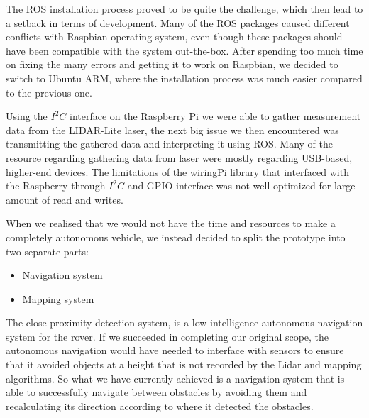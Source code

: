 The ROS installation process proved to be quite the challenge, which then lead to a setback in terms of development. Many of the ROS packages caused different conflicts with Raspbian operating system, even though these packages should have been compatible with the system out-the-box. After spending too much time on fixing the many errors and getting it to work on Raspbian, we decided to switch to Ubuntu ARM, where the installation process was much easier compared to the previous one.

Using the $I^2C$ interface on the Raspberry Pi we were able to gather measurement data from the LIDAR-Lite laser, the next big issue we then encountered was transmitting the gathered data and interpreting it using ROS. Many of the resource regarding gathering data from laser were mostly regarding USB-based, higher-end devices. The limitations of the wiringPi library that interfaced with the Raspberry through $I^2C$ and GPIO interface was not well optimized for large amount of read and writes. 

When we realised that we would not have the time and resources to make a completely autonomous vehicle, we instead decided to split the prototype into two separate parts: 
\begin{itemize}
	\item Navigation system
	\item Mapping system
\end{itemize}


The close proximity detection system, is a low-intelligence autonomous navigation system for the rover. If we succeeded in completing our original scope, the autonomous navigation would have needed to interface with sensors to ensure that it avoided objects at a height that is not recorded by the Lidar and mapping algorithms. So what we have currently achieved is a navigation system that is able to successfully navigate between obstacles by avoiding them and recalculating its direction according to where it detected the obstacles.\\

